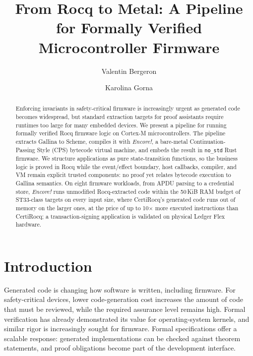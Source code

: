 \documentclass[runningheads]{llncs}
\newcommand{\encore}{\textit{Encore!}}
\newcommand{\code}[1]{\texttt{#1}}
\begin{document}
\title{From Rocq to Metal: A Pipeline for Formally Verified Microcontroller Firmware}

\author{Valentin Bergeron \and Karolina Gorna}

\maketitle

\begin{abstract}
Enforcing invariants in safety-critical firmware is increasingly urgent as generated code becomes widespread, but standard extraction targets for proof assistants require runtimes too large for many embedded devices.
We present a pipeline for running formally verified Rocq firmware logic on Cortex-M microcontrollers.
The pipeline extracts Gallina to Scheme, compiles it with \encore, a bare-metal Continuation-Passing Style (CPS) bytecode virtual machine, and embeds the result in \code{no\_std} Rust firmware.
We structure applications as pure state-transition functions, so the business logic is proved in Rocq while the event/effect boundary, host callbacks, compiler, and VM remain explicit trusted components: no proof yet relates bytecode execution to Gallina semantics.
On eight firmware workloads, from APDU parsing to a credential store, \encore{} runs unmodified Rocq-extracted code within the 50\,KiB RAM budget of ST33-class targets on every input size, where CertiRocq's generated code runs out of memory on the larger ones, at the price of up to 10$\times$ more executed instructions than CertiRocq; a transaction-signing application is validated on physical Ledger Flex hardware.

\end{abstract}

\section{Introduction}

Generated code is changing how software is written, including firmware.
For safety-critical devices, lower code-generation cost increases the amount of code that must be reviewed, while the required assurance level remains high.
Formal verification has already demonstrated its value for operating-system kernels, and similar rigor is increasingly sought for firmware.
Formal specifications offer a scalable response: generated implementations can be checked against theorem statements, and proof obligations become part of the development interface.
\end{document}
